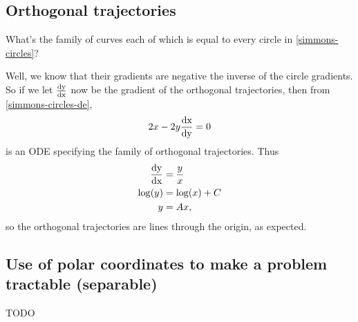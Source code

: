 \subsection{Orthogonal trajectories}
What's the family of curves each of which is equal to every circle in \eqref{simmons-circles}?

Well, we know that their gradients are negative the inverse of the circle
gradients. So if we let $\frac{\operatorname{\text{dy}}}{\operatorname{\text{dx}}}$ now be the gradient of the orthogonal
trajectories, then from \eqref{simmons-circles-de},
\begin{align*}
  2x - 2y\frac{\operatorname{\text{dx}}}{\operatorname{\text{dy}}} = 0
\end{align*}
is an ODE specifying the family of orthogonal trajectories. Thus
\begin{align*}
  \frac{\operatorname{\text{dy}}}{\operatorname{\text{dx}}} &= \frac{y}{x}\\
  \log(y) &= \log(x) + C\\
       y &= Ax,
\end{align*}
so the orthogonal trajectories are lines through the origin, as expected.

\subsection{Use of polar coordinates to make a problem tractable (separable)}
TODO

